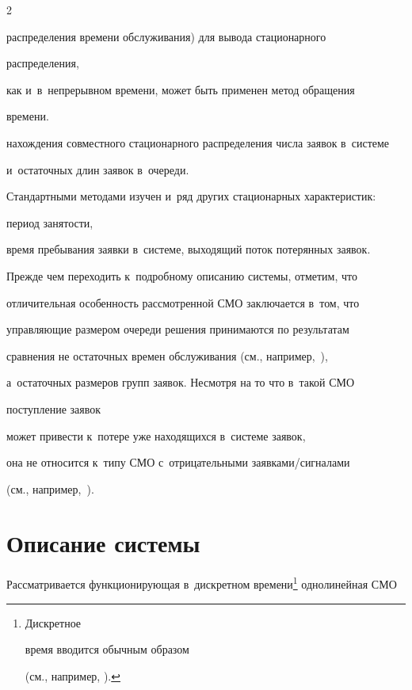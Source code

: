 \begin{multicols}{2}
{распределения времени обслуживания) для вывода стационарного 


распределения,


как и~в~непрерывном времени, может быть применен метод обращения 


времени.}


нахождения совместного стационарного распределения числа заявок в~системе 


и~остаточных длин заявок в~очереди.


Стандартными методами изучен и~ряд других стационарных характеристик: 


период занятости,


время пребывания заявки в~системе, выходящий поток потерянных заявок.





Прежде чем переходить к~подробному описанию системы, отметим, что 


отличительная особенность рассмотренной СМО заключается в~том, что 


управ\-ля\-ющие размером очереди решения принимаются по результатам


сравнения не остаточных времен обслуживания (см., например,~\cite{tata,i10,i11}), 


а~остаточных размеров групп заявок. Несмотря на то что в~такой СМО 


поступление заявок


может привести к~потере уже находящихся в~системе заявок,


она не относится к~типу СМО с~отрицательными за\-яв\-ка\-ми/сиг\-на\-ла\-ми 


(см., например,~\cite{i12}).











\section{Описание системы}





Рассматривается функционирующая в~дискретном времени\footnote{Дискретное 


время вводится обычным образом


(см., например, \cite{distime}).} однолинейная СМО



\end{multicols}
